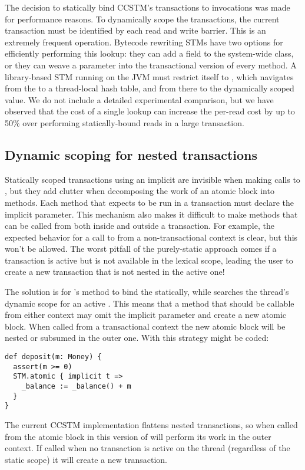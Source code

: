 The decision to statically bind CCSTM's transactions to 
invocations was made for performance reasons.  To dynamically scope
the transactions, the current transaction must be identified by each
read and write barrier.  This is an extremely frequent operation.
Bytecode rewriting STMs have two options for efficiently performing this
lookup: they can add a field to the system-wide  class,
or they can weave a  parameter into the transactional version
of every method.  A library-based STM running on the JVM must restrict
itself to , which navigates from the 
to a thread-local hash table, and from there to the dynamically scoped
value.  We do not include a detailed experimental comparison, but we
have observed that the cost of a single  lookup can
increase the per-read cost by up to 50\% over
performing statically-bound
reads in a large transaction.

\subsection{Dynamic scoping for nested transactions}
\label{sec:hybrid}

Statically scoped transactions using an implicit  are invisible
when making calls to , but they add clutter when decomposing the
work of an atomic block into methods.  Each method that expects to be run
in a transaction must declare the implicit parameter.  This mechanism also
makes it difficult to make methods that can be called from both inside and
outside a transaction.  For example, the expected behavior for a call to
 from a non-transactional context is clear, but this won't
be allowed.  The worst pitfall of the purely-static approach comes if a
transaction is active but is not available in the lexical scope, leading
the user to create a new transaction that is not nested in the active one!

The solution is for 's method to bind the  statically,
while  searches the thread's dynamic scope for an active
.  This means that a method that should be callable from either
context may omit the implicit  parameter and create a new atomic
block.  When called from a transactional context the new atomic block will
be nested or subsumed in the outer one.  With this strategy 
might be coded:

\lstset{numbers=none}
\lstset{xleftmargin=0.125in}
\begin{lstlisting}
def deposit(m: Money) {
  assert(m >= 0)
  STM.atomic { implicit t =>
    _balance := _balance() + m
  }
}
\end{lstlisting}
\lstset{numbers=left}
\lstset{xleftmargin=0.25in}

The current CCSTM implementation flattens nested transactions, so
when called from the atomic block in  this version of
 will perform its work in the outer context.  If called
when no transaction is active on the thread (regardless of the static
scope) it will create a new transaction.
